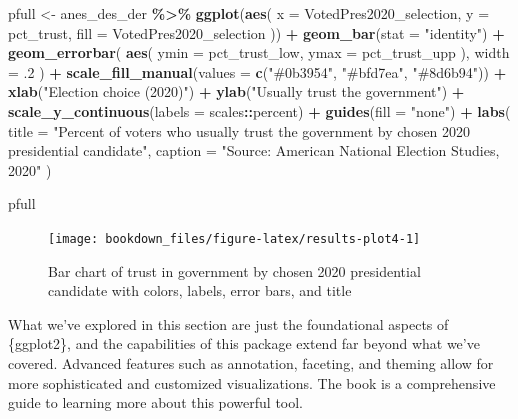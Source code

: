 \documentclass[
]{krantz}
\makeatletter
\newenvironment{Shaded}{\begin{snugshade}}{\end{snugshade}}
\newcommand{\AttributeTok}[1]{\textcolor[rgb]{0.27,0.27,0.27}{#1}}
\newcommand{\DecValTok}[1]{\textcolor[rgb]{0.06,0.06,0.06}{#1}}
\newcommand{\FunctionTok}[1]{\textcolor[rgb]{0.27,0.27,0.27}{\textbf{#1}}}
\newcommand{\NormalTok}[1]{#1}
\newcommand{\OtherTok}[1]{\textcolor[rgb]{0.37,0.37,0.37}{#1}}
\newcommand{\SpecialCharTok}[1]{\textcolor[rgb]{0.43,0.43,0.43}{\textbf{#1}}}
\newcommand{\StringTok}[1]{\textcolor[rgb]{0.5,0.5,0.5}{#1}}
\newenvironment{kframe}{%
\medskip{}
\setlength{\fboxsep}{.8em}
 \def\at@end@of@kframe{}%
 \ifinner\ifhmode%
  \def\at@end@of@kframe{\end{minipage}}%
  \begin{minipage}{\columnwidth}%
 \fi\fi%
 \def\FrameCommand##1{\hskip\@totalleftmargin \hskip-\fboxsep
 \colorbox{shadecolor}{##1}\hskip-\fboxsep
     \hskip-\linewidth \hskip-\@totalleftmargin \hskip\columnwidth}%
 \MakeFramed {\advance\hsize-\width
   \@totalleftmargin\z@ \linewidth\hsize
   \@setminipage}}%
 {\par\unskip\endMakeFramed%
 \at@end@of@kframe}
\renewenvironment{Shaded}{\begin{kframe}}{\end{kframe}}
\makeatother
\begin{document}
\begin{Shaded}
\begin{Highlighting}[]
\NormalTok{pfull }\OtherTok{\textless{}{-}}
\NormalTok{  anes\_des\_der }\SpecialCharTok{\%\textgreater{}\%}
  \FunctionTok{ggplot}\NormalTok{(}\FunctionTok{aes}\NormalTok{(}
    \AttributeTok{x =}\NormalTok{ VotedPres2020\_selection,}
    \AttributeTok{y =}\NormalTok{ pct\_trust,}
    \AttributeTok{fill =}\NormalTok{ VotedPres2020\_selection}
\NormalTok{  )) }\SpecialCharTok{+}
  \FunctionTok{geom\_bar}\NormalTok{(}\AttributeTok{stat =} \StringTok{"identity"}\NormalTok{) }\SpecialCharTok{+}
  \FunctionTok{geom\_errorbar}\NormalTok{(}
    \FunctionTok{aes}\NormalTok{(}
      \AttributeTok{ymin =}\NormalTok{ pct\_trust\_low,}
      \AttributeTok{ymax =}\NormalTok{ pct\_trust\_upp}
\NormalTok{    ),}
    \AttributeTok{width =}\NormalTok{ .}\DecValTok{2}
\NormalTok{  ) }\SpecialCharTok{+}
  \FunctionTok{scale\_fill\_manual}\NormalTok{(}\AttributeTok{values =} \FunctionTok{c}\NormalTok{(}\StringTok{"\#0b3954"}\NormalTok{, }\StringTok{"\#bfd7ea"}\NormalTok{, }\StringTok{"\#8d6b94"}\NormalTok{)) }\SpecialCharTok{+}
  \FunctionTok{xlab}\NormalTok{(}\StringTok{"Election choice (2020)"}\NormalTok{) }\SpecialCharTok{+}
  \FunctionTok{ylab}\NormalTok{(}\StringTok{"Usually trust the government"}\NormalTok{) }\SpecialCharTok{+}
  \FunctionTok{scale\_y\_continuous}\NormalTok{(}\AttributeTok{labels =}\NormalTok{ scales}\SpecialCharTok{::}\NormalTok{percent) }\SpecialCharTok{+}
  \FunctionTok{guides}\NormalTok{(}\AttributeTok{fill =} \StringTok{"none"}\NormalTok{) }\SpecialCharTok{+}
  \FunctionTok{labs}\NormalTok{(}
    \AttributeTok{title =} \StringTok{"Percent of voters who usually trust the government}
\StringTok{       by chosen 2020 presidential candidate"}\NormalTok{,}
    \AttributeTok{caption =} \StringTok{"Source: American National Election Studies, 2020"}
\NormalTok{  )}

\NormalTok{pfull}
\end{Highlighting}
\end{Shaded}

\begin{figure}
\texttt{[image: bookdown\_files/figure-latex/results-plot4-1]} \caption{Bar chart of trust in government by chosen 2020 presidential candidate with colors, labels, error bars, and title}\label{fig:results-plot4}
\end{figure}

What we've explored in this section are just the foundational aspects of \{ggplot2\}, and the capabilities of this package extend far beyond what we've covered. Advanced features such as annotation, faceting, and theming allow for more sophisticated and customized visualizations. The book \citet{wickham2023ggplot2} is a comprehensive guide to learning more about this powerful tool.
\end{document}

